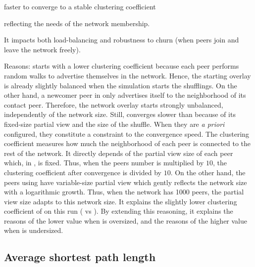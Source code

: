 \begin{asparadesc}
\begin{inparaenum}
  \item faster to converge to a stable clustering coefficient
  \item reflecting the needs of the network membership.
  \end{inparaenum}
  It impacts both load-balancing and robustness to churn (when peers join and
  leave the network freely).
\item[Reasons:] \CYCLON starts with a lower clustering coefficient because each
  peer performs random walks to advertise themselves in the network. Hence, the
  starting overlay is already slightly balanced when the simulation starts the
  shufflings. On the other hand, a newcomer peer in \SPRAY only advertises
  itself to the neighborhood of its contact peer. Therefore, the network
  overlay starts strongly unbalanced, independently of the network size. Still,
  \CYCLON converges slower than \SPRAY because of its fixed-size partial view
  and the size of the shuffle. When they are \emph{a priori} configured, they
  constitute a constraint to the convergence speed.  The clustering coefficient
  measures how much the neighborhood of each peer is connected to the rest of
  the network. It directly depends of the partial view size of each peer which,
  in \CYCLON, is fixed. Thus, when the peers number is multiplied by $10$, the
  clustering coefficient after convergence is divided by $10$. On the other
  hand, the peers using \SPRAY have variable-size partial view which gently
  reflects the network size with a logarithmic growth. Thus, when the network
  has 1000 peers, the partial view size adapts to this network size. It
  explains the slightly lower clustering coefficient of \SPRAY on this run
  ( vs ). By extending this reasoning, it explains the
  reasons of the \SPRAY lower value when \CYCLON is oversized, and the reasons
  of the \SPRAY higher value when \CYCLON is undersized.
\end{asparadesc}

\subsection{Average shortest path length}
\label{subsec:avg}

